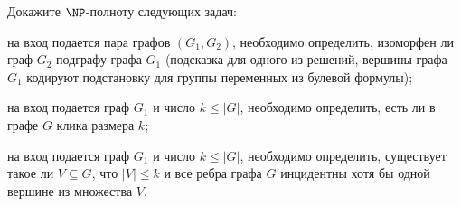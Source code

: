 Докажите $\NP$-полноту следующих задач:
\begin{enumcyr}
    \item на вход подается пара графов $(G_1, G_2)$, необходимо определить, изоморфен ли граф $G_2$
	    подграфу графа $G_1$ (подсказка для одного из решений, вершины графа $G_1$ кодируют подстановку
        для группы переменных из булевой формулы);
    \item на вход подается граф $G_1$ и число $k \le |G|$, необходимо определить, есть ли в графе $G$
	    клика размера $k$;
    \item на вход подается граф $G_1$ и число $k \le |G|$, необходимо определить, существует такое ли $V
	    \subseteq G$, что $|V| \le k$ и все ребра графа $G$ инцидентны хотя бы одной вершине из множества
        $V$.
\end{enumcyr}